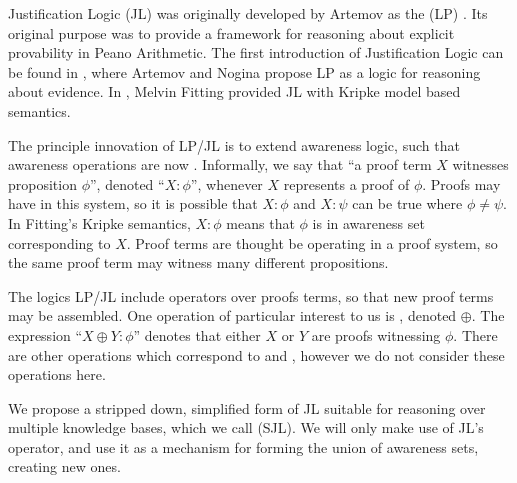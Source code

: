 Justification Logic (JL) was originally developed by Artemov as the
 (LP) {\cite{artemov_logic_1994}}.  Its original
purpose was to provide a framework for reasoning about explicit provability in
Peano Arithmetic.  The first introduction of Justification Logic can be found
in {\cite{artemov_introducing_2005}}, where Artemov and Nogina propose LP as a
logic for reasoning about evidence.  In {\cite{fitting_logic_2005}}, Melvin
Fitting provided JL with Kripke model based semantics.

The principle innovation of LP/JL is to extend awareness logic, such that
awareness operations are now .  Informally, we say that
``a proof term $X$ witnesses proposition $\phi$'', denoted ``$X : \phi$'',
whenever $X$ represents a proof of $\phi$.  Proofs may have
{} in this system, so it is possible that $X :
\phi$ and $X : \psi$ can be true where $\phi \neq \psi$.  In Fitting's Kripke
semantics, $X : \phi$ means that $\phi$ is in awareness set corresponding to
$X$.  Proof terms are thought be operating in a 
proof system, so the same proof term may witness many different propositions.

The logics LP/JL include operators over proofs terms, so that new proof terms
may be assembled.  One operation of particular interest to us is
{}, denoted $\oplus$.  The expression ``$X \oplus Y : \phi$''
denotes that either $X$ or $Y$ are proofs witnessing $\phi$.  There are other
operations which correspond to  and
, however we do not consider these
operations here.


We propose a stripped down, simplified form of JL suitable for reasoning
over multiple knowledge bases, which we call  (SJL). %
We will only make use of JL's {} operator,
and use it as a mechanism for forming the union of awareness sets, creating new ones.




